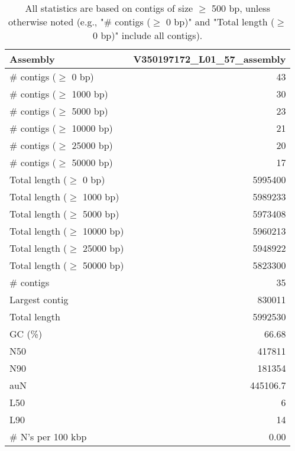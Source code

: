 \documentclass[12pt,a4paper]{article}
\begin{document}
\begin{table}[ht]
\begin{center}
\caption{All statistics are based on contigs of size $\geq$ 500 bp, unless otherwise noted (e.g., "\# contigs ($\geq$ 0 bp)" and "Total length ($\geq$ 0 bp)" include all contigs).}
\begin{tabular}{|l*{1}{|r}|}
\hline
Assembly & V350197172\_L01\_57\_assembly \\ \hline
\# contigs ($\geq$ 0 bp) & 43 \\ \hline
\# contigs ($\geq$ 1000 bp) & 30 \\ \hline
\# contigs ($\geq$ 5000 bp) & 23 \\ \hline
\# contigs ($\geq$ 10000 bp) & 21 \\ \hline
\# contigs ($\geq$ 25000 bp) & 20 \\ \hline
\# contigs ($\geq$ 50000 bp) & 17 \\ \hline
Total length ($\geq$ 0 bp) & 5995400 \\ \hline
Total length ($\geq$ 1000 bp) & 5989233 \\ \hline
Total length ($\geq$ 5000 bp) & 5973408 \\ \hline
Total length ($\geq$ 10000 bp) & 5960213 \\ \hline
Total length ($\geq$ 25000 bp) & 5948922 \\ \hline
Total length ($\geq$ 50000 bp) & 5823300 \\ \hline
\# contigs & 35 \\ \hline
Largest contig & 830011 \\ \hline
Total length & 5992530 \\ \hline
GC (\%) & 66.68 \\ \hline
N50 & 417811 \\ \hline
N90 & 181354 \\ \hline
auN & 445106.7 \\ \hline
L50 & 6 \\ \hline
L90 & 14 \\ \hline
\# N's per 100 kbp & 0.00 \\ \hline
\end{tabular}
\end{center}
\end{table}
\end{document}
